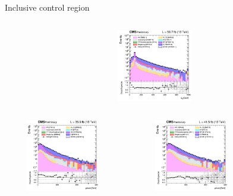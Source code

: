 \documentclass[8pt]{beamer}
\begin{document}
\begin{frame}{Inclusive control region}
\begin{columns}
\begin{column}{0.33\textwidth}
\begin{center}
			\begin{block}{}\end{block}\vspace{10pt}
     			\includegraphics[width=1.0\textwidth, height=90pt]{figs/2018/log_cratio_inclusiveCR_ee_mll.png}
    		\end{center}		
		\end{column}
\end{columns}
\begin{columns}
		\begin{column}{0.33\textwidth}
			\begin{center}
     			\includegraphics[width=1.0\textwidth, height=90pt]{figs/2016/log_cratio_inclusiveCR_ee_METcorrected_pt.png}
    		\end{center}		
		\end{column}
		\begin{column}{0.33\textwidth}
			\begin{center}
     			\includegraphics[width=1.0\textwidth, height=90pt]{figs/2017/log_cratio_inclusiveCR_ee_METcorrected_pt.png}
    		\end{center}		
		\end{column}
		\begin{column}{0.33\textwidth}

\end{column}
\end{columns}
\end{frame}
\end{document}
